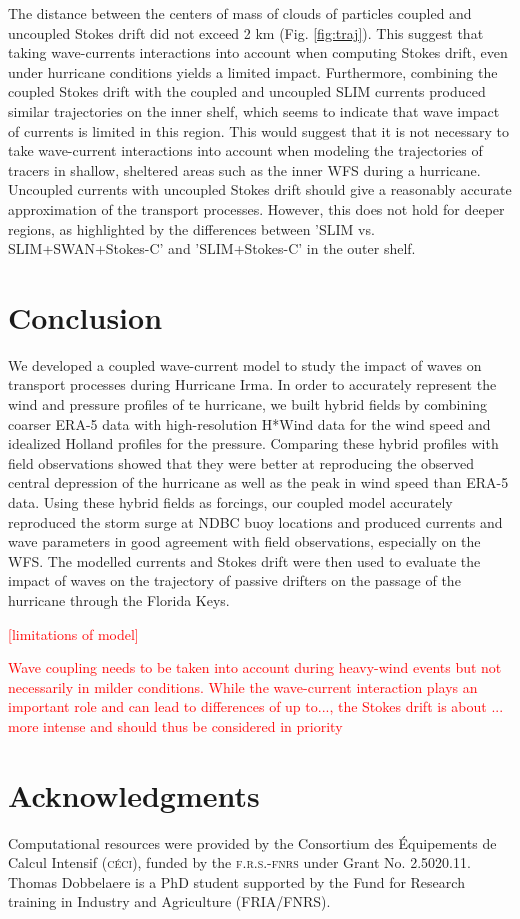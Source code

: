 \documentclass[preprint,12pt,authoryear]{elsarticle}
\begin{document}
The distance between the centers of mass of clouds of particles coupled and uncoupled Stokes drift did not exceed 2 km (Fig. \ref{fig:traj}). This suggest that taking wave-currents interactions into account when computing Stokes drift, even under hurricane conditions yields a limited impact. Furthermore, combining the coupled Stokes drift with the coupled and uncoupled SLIM currents produced similar trajectories on the inner shelf, which seems to indicate that wave impact of currents is limited in this region. This would suggest that it is not necessary to take wave-current interactions into account when modeling the trajectories of tracers in shallow, sheltered areas such as the inner WFS during a hurricane. Uncoupled currents with uncoupled Stokes drift should give a reasonably accurate approximation of the transport processes. However, this does not hold for deeper regions, as highlighted by the differences between 'SLIM vs. SLIM+SWAN+Stokes-C' and 'SLIM+Stokes-C' in the outer shelf. 

\section{Conclusion}

We developed a coupled wave-current model to study the impact of waves on transport processes during Hurricane Irma. In order to accurately represent the wind and pressure profiles of te hurricane, we built hybrid fields by combining coarser ERA-5 data with high-resolution H*Wind data for the wind speed and idealized Holland profiles for the pressure. Comparing these hybrid profiles with field observations showed that they were better at reproducing the observed central depression of the hurricane as well as the peak in wind speed than ERA-5 data. Using these hybrid fields as forcings, our coupled model accurately reproduced the storm surge at NDBC buoy locations and produced currents and wave parameters in good agreement with field observations, especially on the WFS. The modelled currents and Stokes drift were then used to evaluate the impact of waves on the trajectory of passive drifters on the passage of the hurricane through the Florida Keys.

\textcolor{red}{[limitations of model]}

\textcolor{red}{Wave coupling needs to be taken into account during heavy-wind events but not necessarily in milder conditions. While the wave-current interaction plays an important role and can lead to differences of up to..., the Stokes drift is about ... more intense and should thus be considered in priority}

\section*{Acknowledgments}
Computational resources were provided by the Consortium des \'Equipements de Calcul Intensif (\textsc{c\'eci}), funded by the \textsc{f.r.s.-fnrs} under Grant No. 2.5020.11. Thomas Dobbelaere is a PhD student supported by the Fund for Research training in Industry and Agriculture (\textsc{FRIA}/\textsc{FNRS}).

 

\end{document}
